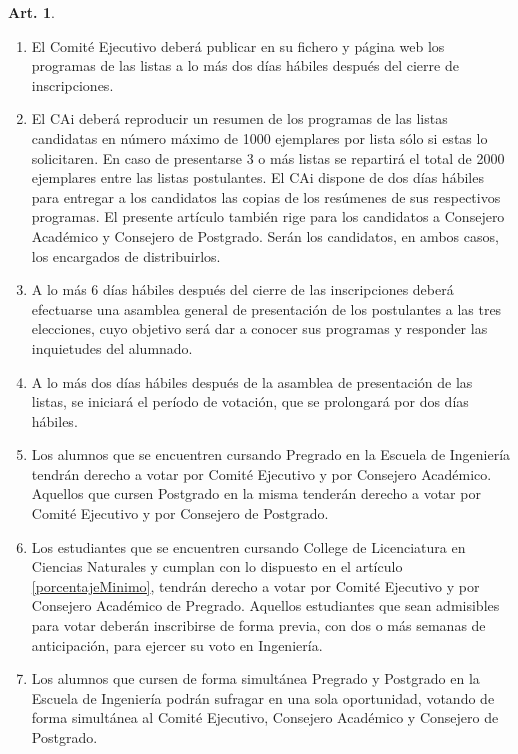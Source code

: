 \documentclass[letterpaper,11pt]{article}
\theoremstyle{definition}%
\newtheorem{art}{Art.} %
\begin{document}
\begin{art}
\begin{enumerate}
		\item El Comité Ejecutivo deberá publicar en su fichero y página web los programas de las listas a lo más dos días hábiles después del cierre de inscripciones.

		\item El CAi deberá reproducir un resumen de los programas de las listas candidatas en número máximo de 1000 ejemplares por lista sólo si estas lo solicitaren. En caso de presentarse 3 o más listas se repartirá el total de 2000 ejemplares entre las listas postulantes. El CAi dispone de dos días hábiles para entregar a los candidatos las copias de los resúmenes de sus respectivos programas. El presente artículo también rige para los candidatos a Consejero Académico y Consejero de Postgrado. Serán los candidatos, en ambos casos, los encargados de distribuirlos.

		\item A lo más 6 días hábiles después del cierre de las inscripciones deberá efectuarse una asamblea general de presentación de los postulantes a las tres elecciones, cuyo objetivo será dar a conocer sus programas y responder las inquietudes del alumnado.

		\item \label{periodo}A lo más dos días hábiles después de la asamblea de presentación de las listas, se iniciará el período de votación, que se prolongará por dos días hábiles.

		\item \label{votantes}Los alumnos que se encuentren cursando Pregrado en la Escuela de Ingeniería tendrán derecho a votar por Comité Ejecutivo y por Consejero Académico. Aquellos que cursen Postgrado en la misma tenderán derecho a votar por Comité Ejecutivo y por Consejero de Postgrado.

		\item \label{votantesCollege} Los estudiantes que se encuentren cursando College de Licenciatura en Ciencias Naturales y cumplan con lo dispuesto en el artículo \ref{porcentajeMinimo}, tendrán derecho a votar por Comité Ejecutivo y por Consejero Académico de Pregrado. Aquellos estudiantes que sean admisibles para votar deberán inscribirse de forma previa, con dos o más semanas de anticipación, para ejercer su voto en Ingeniería.

		\item Los alumnos que cursen de forma simultánea Pregrado y Postgrado en la Escuela de Ingeniería podrán sufragar en una sola oportunidad, votando de forma simultánea al Comité Ejecutivo, Consejero Académico y Consejero de Postgrado.


\end{enumerate}
\end{art}
\end{document}
